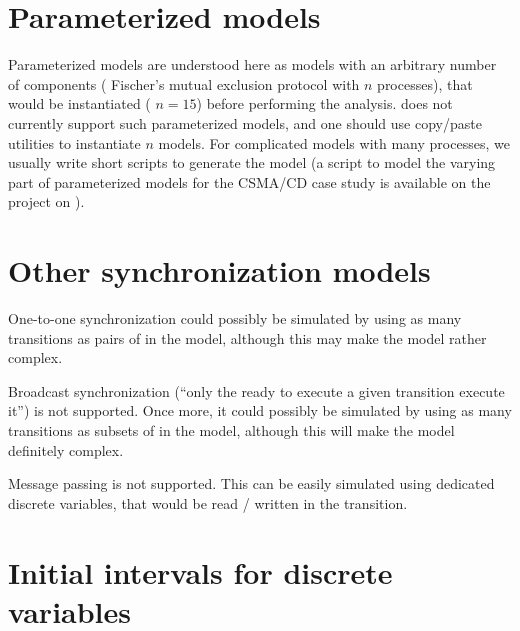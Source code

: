 \section{Parameterized models}

Parameterized models are understood here as models with an arbitrary number of components (\eg{} Fischer's mutual exclusion protocol with $n$ processes), that would be instantiated (\eg{} $n = 15$) before performing the analysis.
\imitator{} does not currently support such parameterized models, and one should use copy/paste utilities to instantiate $n$ models.
For complicated models with many processes, we usually write short scripts to generate the model (a script  to model the varying part of parameterized models for the CSMA/CD case study is available on the \imitator{} project on \GitHubIMI{}).




\section{Other synchronization models}

One-to-one synchronization could possibly be simulated by using as many transitions as pairs of \IPTA{} in the model, although this may make the model rather complex.



Broadcast synchronization (``only the \IPTA{} ready to execute a given transition execute it'') is not supported.
Once more, it could possibly be simulated by using as many transitions as subsets of \IPTA{} in the model, although this will make the model definitely complex.



Message passing is not supported.
This can be easily simulated using dedicated discrete variables, that would be read / written in the transition.



\section{Initial intervals for discrete variables}

